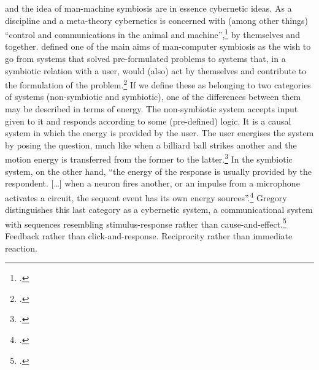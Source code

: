  and the idea of man-machine symbiosis are in essence cybernetic ideas. As a discipline and a meta-theory cybernetics is concerned with (among other things) ``control and communications in the animal and machine'',\footcite[There are many definitions of cybernetics---this one is from Norbert Wiener's \emph{Cybernetics} (1960), as cited in][]{cybernetic08} by themselves and together. \citeauthor{licklider60} defined one of the main aims of man-computer symbiosis as the wish to go from systems that solved pre-formulated problems to systems that, in a symbiotic relation with a user, would (also) act by themselves and contribute to the formulation of the problem.\footcite{licklider60} If we define these as belonging to two categories of systems (non-symbiotic and symbiotic), one of the differences between them may be described in terms of energy. The non-symbiotic system accepts input given to it and responds according to some (pre-defined) logic. It is a causal system in which the energy is provided by the user. The user energises the system by posing the question, much like when a billiard ball strikes another and the motion energy is transferred from the former to the latter.\footcite[405]{bateson72:cyber} In the symbiotic system, on the other hand, ``the energy of the response is usually provided by the respondent. [\ldots] when a neuron fires another, or an impulse from a microphone activates a circuit, the sequent event has its own energy sources''.\footcite[409]{bateson72:cyber} Gregory \citeauthor{bateson72:steps} distinguishes this last category as a cybernetic system, a communicational system with sequences resembling stimulus-response rather than cause-and-effect.\footcite[409]{bateson72:cyber} Feedback rather than click-and-response. Reciprocity rather than immediate reaction.

